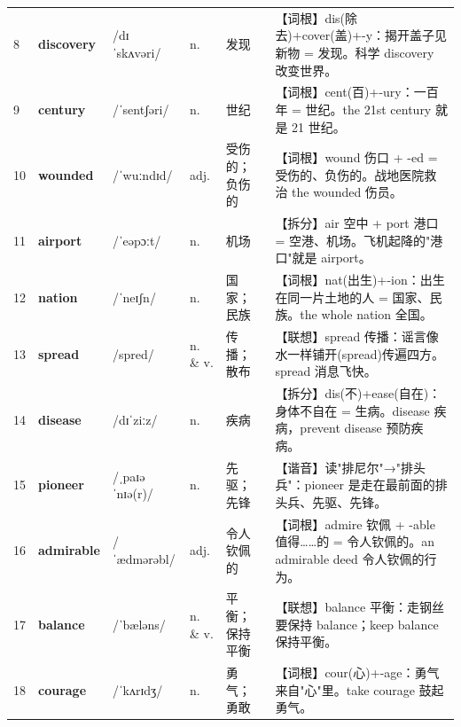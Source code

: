 \documentclass[UTF8,a4paper,11pt,oneside]{ctexbook}
\newcommand{\cellword}[1]{{\bfseries\textcolor{wordcol}{#1}}}
\newcommand{\cellipa}[1]{{\footnotesize\textcolor{ipacol}{#1}}}
\newcommand{\cellpos}[1]{\textcolor{poscol}{#1}}
\newcommand{\cellno}[1]{\textcolor{volcolor!75!black}{#1}}
\begin{document}
{\begin{longtable}{@{}C{0.045\textwidth}L{0.155\textwidth}L{0.175\textwidth}C{0.070\textwidth}L{0.180\textwidth}L{0.282\textwidth}@{}}
\cellno{8} & \cellword{discovery} & \cellipa{/dɪˈskʌvəri/} & \cellpos{n.} & 发现 & \textcolor{tagRoot}{【词根】}dis(除去)+cover(盖)+-y：揭开盖子见新物 = 发现。科学 discovery 改变世界。 \\
 \cellno{9} & \cellword{century} & \cellipa{/ˈsentʃəri/} & \cellpos{n.} & 世纪 & \textcolor{tagRoot}{【词根】}cent(百)+-ury：一百年 = 世纪。the 21st century 就是 21 世纪。 \\
\cellno{10} & \cellword{wounded} & \cellipa{/ˈwuːndɪd/} & \cellpos{adj.} & 受伤的；负伤的 & \textcolor{tagRoot}{【词根】}wound 伤口 + -ed = 受伤的、负伤的。战地医院救治 the wounded 伤员。 \\
 \cellno{11} & \cellword{airport} & \cellipa{/ˈeəpɔːt/} & \cellpos{n.} & 机场 & \textcolor{tagSplit}{【拆分】}air 空中 + port 港口 = 空港、机场。飞机起降的"港口"就是 airport。 \\
\cellno{12} & \cellword{nation} & \cellipa{/ˈneɪʃn/} & \cellpos{n.} & 国家；民族 & \textcolor{tagRoot}{【词根】}nat(出生)+-ion：出生在同一片土地的人 = 国家、民族。the whole nation 全国。 \\
 \cellno{13} & \cellword{spread} & \cellipa{/spred/} & \cellpos{n.  \& v.} & 传播；散布 & \textcolor{tagAssoc}{【联想】}spread 传播：谣言像水一样铺开(spread)传遍四方。spread 消息飞快。 \\
\cellno{14} & \cellword{disease} & \cellipa{/dɪˈziːz/} & \cellpos{n.} & 疾病 & \textcolor{tagSplit}{【拆分】}dis(不)+ease(自在)：身体不自在 = 生病。disease 疾病，prevent disease 预防疾病。 \\
 \cellno{15} & \cellword{pioneer} & \cellipa{/ˌpaɪəˈnɪə(r)/} & \cellpos{n.} & 先驱；先锋 & \textcolor{tagSound}{【谐音】}读"排尼尔"→\allowbreak{}"排头兵"：pioneer 是走在最前面的排头兵、先驱、先锋。 \\
\cellno{16} & \cellword{admirable} & \cellipa{/ˈædmərəbl/} & \cellpos{adj.} & 令人钦佩的 & \textcolor{tagRoot}{【词根】}admire 钦佩 + -able 值得……的 = 令人钦佩的。an admirable deed 令人钦佩的行为。 \\
 \cellno{17} & \cellword{balance} & \cellipa{/ˈbæləns/} & \cellpos{n.  \& v.} & 平衡；保持平衡 & \textcolor{tagAssoc}{【联想】}balance 平衡：走钢丝要保持 balance；keep balance 保持平衡。 \\
\cellno{18} & \cellword{courage} & \cellipa{/ˈkʌrɪdʒ/} & \cellpos{n.} & 勇气；勇敢 & \textcolor{tagRoot}{【词根】}cour(心)+-age：勇气来自"心"里。take courage 鼓起勇气。 \\

\end{longtable}}
\end{document}
